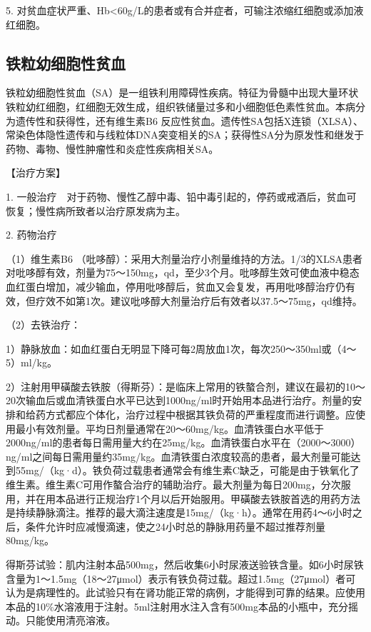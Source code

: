 5.
对贫血症状严重、Hb<60g/L的患者或有合并症者，可输注浓缩红细胞或添加液红细胞。

\subsection{铁粒幼细胞性贫血}

铁粒幼细胞性贫血（SA）是一组铁利用障碍性疾病。特征为骨髓中出现大量环状铁粒幼红细胞，红细胞无效生成，组织铁储量过多和小细胞低色素性贫血。本病分为遗传性和获得性，还有维生素B{6}
反应性贫血。遗传性SA包括X连锁（XLSA）、常染色体隐性遗传和与线粒体DNA突变相关的SA；获得性SA分为原发性和继发于药物、毒物、慢性肿瘤性和炎症性疾病相关SA。

【治疗方案】

1.
一般治疗　对于药物、慢性乙醇中毒、铅中毒引起的，停药或戒酒后，贫血可恢复；慢性病所致者以治疗原发病为主。

2. 药物治疗

（1）维生素B{6}
（吡哆醇）：采用大剂量治疗小剂量维持的方法。1/3的XLSA患者对吡哆醇有效，剂量为75～150mg，qd，至少3个月。吡哆醇生效可使血液中稳态血红蛋白增加，减少输血，停用吡哆醇后，贫血又会复发，再用吡哆醇治疗仍有效，但疗效不如第1次。建议吡哆醇大剂量治疗后有效者以37.5～75mg，qd维持。

（2）去铁治疗：

1）静脉放血：如血红蛋白无明显下降可每2周放血1次，每次250～350ml或（4～5）ml/kg。

2）注射用甲磺酸去铁胺（得斯芬）：是临床上常用的铁螯合剂，建议在最初的10～20次输血后或血清铁蛋白水平已达到1000ng/ml时开始用本品进行治疗。剂量的安排和给药方式都应个体化，治疗过程中根据其铁负荷的严重程度而进行调整。应使用最小有效剂量。平均日剂量通常在20～60mg/kg。血清铁蛋白水平低于2000ng/ml的患者每日需用量大约在25mg/kg。血清铁蛋白水平在（2000～3000）ng/ml之间每日需用量约35mg/kg。血清铁蛋白浓度较高的患者，最大剂量可能达到55mg/（kg·d）。铁负荷过载患者通常会有维生素C缺乏，可能是由于铁氧化了维生素。维生素C可用作螯合治疗的辅助治疗。最大剂量为每日200mg，分次服用，并在用本品进行正规治疗1个月以后开始服用。甲磺酸去铁胺首选的用药方法是持续静脉滴注。推荐的最大滴注速度是15mg/（kg·h）。通常在用药4～6小时之后，条件允许时应减慢滴速，使之24小时总的静脉用药量不超过推荐剂量80mg/kg。

得斯芬试验：肌内注射本品500mg，然后收集6小时尿液送验铁含量。如6小时尿铁含量为1～1.5mg（18～27μmol）表示有铁负荷过载。超过1.5mg（27μmol）者可认为是病理性的。此试验只有在肾功能正常的病例，才能得到可靠的结果。应使用本品的10\%水溶液用于注射。5ml注射用水注入含有500mg本品的小瓶中，充分摇动。只能使用清亮溶液。

